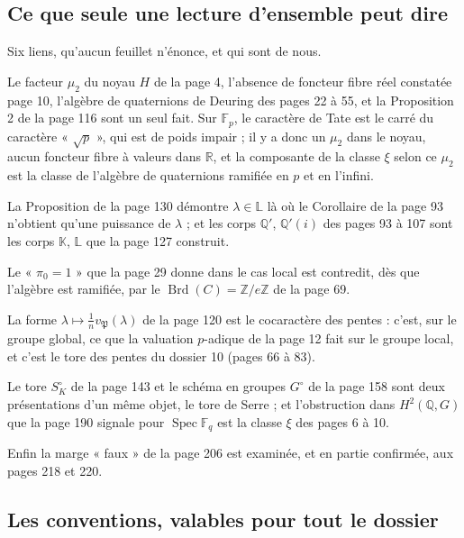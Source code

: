 \documentclass[11pt,a4paper]{article}
\begin{document}
\subsection*{Ce que seule une lecture d'ensemble peut dire}

Six liens, qu'aucun feuillet n'énonce, et qui sont de nous.

Le facteur $\mu_{2}$ du noyau $H$ de la page 4, l'absence de foncteur fibre
réel constatée page 10, l'algèbre de quaternions de Deuring des pages 22 à 55,
et la Proposition 2 de la page 116 sont un seul fait. Sur $\mathbb{F}_{p}$, le
caractère de Tate est le carré du caractère « $\sqrt{p}$ », qui est de poids
impair ; il y a donc un $\mu_{2}$ dans le noyau, aucun foncteur fibre à
valeurs dans $\mathbb{R}$, et la composante de la classe $\xi$ selon ce
$\mu_{2}$ est la classe de l'algèbre de quaternions ramifiée en $p$ et en
l'infini.

La Proposition de la page 130 démontre $\lambda \in \mathbb{L}$ là où le
Corollaire de la page 93 n'obtient qu'une puissance de $\lambda$ ; et les
corps $\mathbb{Q}'$, $\mathbb{Q}'(i)$ des pages 93 à 107 sont les corps
$\mathbb{K}$, $\mathbb{L}$ que la page 127 construit.

Le « $\pi_{0} = 1$ » que la page 29 donne dans le cas local est contredit, dès
que l'algèbre est ramifiée, par le $\operatorname{Brd}(C) = \mathbb{Z}/e\mathbb{Z}$
de la page 69.

La forme $\lambda \mapsto \frac{1}{n} v_{\mathfrak{P}}(\lambda)$ de la page 120
est le cocaractère des pentes : c'est, sur le groupe global, ce que la
valuation $p$-adique de la page 12 fait sur le groupe local, et c'est le tore
des pentes du dossier 10 (pages 66 à 83).

Le tore $S^{\circ}_{K}$ de la page 143 et le schéma en groupes
$G^{\circ}$ de la page 158 sont deux présentations d'un même objet, le tore
de Serre ; et l'obstruction dans $H^{2}(\mathbb{Q}, G)$ que la page 190
signale pour $\operatorname{Spec} \mathbb{F}_{q}$ est la classe $\xi$ des
pages 6 à 10.

Enfin la marge « faux » de la page 206 est examinée, et en partie
confirmée, aux pages 218 et 220.

\subsection*{Les conventions, valables pour tout le dossier}
\end{document}
